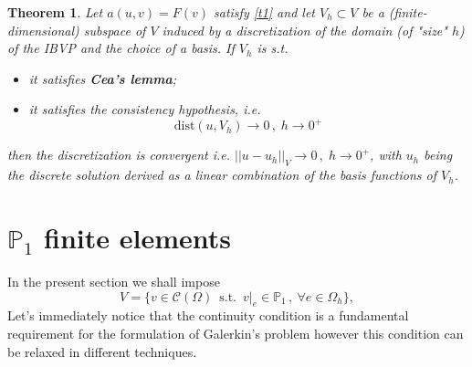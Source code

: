 \documentclass[12pt,openany,twoside,a4paper]{article}
\newtheorem{theom}{Theorem}
\begin{document}
\begin{theom}\label{t2}
Let $a(u,v)=F(v)$ satisfy \ref{t1} and let $V_h\subset V$ be a (finite-dimensional) subspace of $V$ induced by a discretization of the domain (of "size" $h$) of the IBVP and the choice of a basis. If $V_h$ is s.t.
\begin{itemize}
    \item it satisfies \textbf{Cea's lemma};
    \item it satisfies the consistency hypothesis, i.e.
    \begin{equation*}
        \text{dist}(u,V_h)\to0\,,\;h\to0^+
    \end{equation*}
\end{itemize}
then the discretization is convergent i.e. $||u-u_h||_V\to0\,,\;h\to0^+$, with $u_h$ being the discrete solution derived as a linear combination of the basis functions of $V_h$.
\end{theom}
\newpage
\section{$\mathbb{P}_1$ finite elements}
In the present section we shall impose
\begin{equation*}
    V = \big\{v\in\mathcal{C}(\Omega)\:\;\text{s.t.}\:\; v|_e\in\mathbb{P}_1\,,\:\forall e\in\Omega_h\big\},
\end{equation*}
Let's immediately notice that the continuity condition is a fundamental requirement for the formulation of Galerkin's problem however this condition can be relaxed in different techniques.
\end{document}
